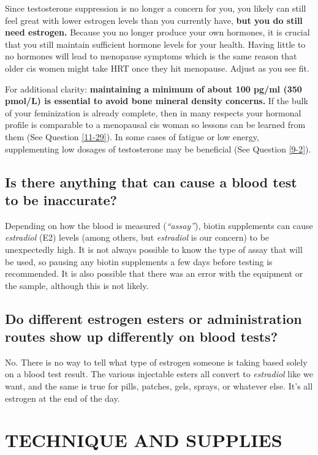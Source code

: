 \documentclass{article}
\begin{document}
Since testosterone suppression is no longer a concern for you, you likely can still feel great with lower estrogen levels than you currently have, \textbf{but you do still need estrogen.} Because you no longer produce your own hormones, it is crucial that you still maintain sufficient hormone levels for your health. Having little to no hormones will lead to menopause symptoms which is the same reason that older cis women might take HRT once they hit menopause. Adjust as you see fit.

For additional clarity: \textbf{maintaining a minimum of about 100 pg/ml (350 pmol/L) is essential to avoid bone mineral density concerns.} If the bulk of your feminization is already complete, then in many respects your hormonal profile is comparable to a menopausal cis woman so lessons can be learned from them (See Question \ref{11-29}). In some cases of fatigue or low energy, supplementing low dosages of testosterone may be beneficial (See Question \ref{9-2}).

\subsection{Is there anything that can cause a blood test to be inaccurate?}

Depending on how the blood is measured (\textit{“assay”}), biotin supplements can cause \textit{estradiol} (E2) levels (among others, but \textit{estradiol }is our concern) to be unexpectedly high. It is not always possible to know the type of assay that will be used, so pausing any biotin supplements a few days before testing is recommended. It is also possible that there was an error with the equipment or the sample, although this is not likely.

\subsection{Do different estrogen esters or administration routes show up differently on blood tests?}\label{4-16}

No. There is no way to tell what type of estrogen someone is taking based solely on a blood test result. The various injectable esters all convert to \textit{estradiol }like we want, and the same is true for pills, patches, gels, sprays, or whatever else. It's all estrogen at the end of the day.

 

\section{TECHNIQUE AND SUPPLIES} \label{ts}
\end{document}
